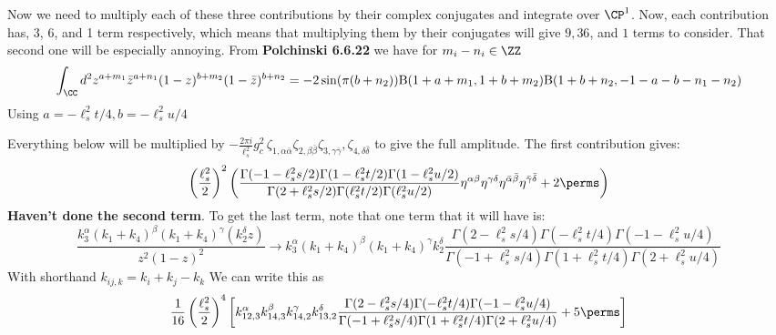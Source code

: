 	Now we need to multiply each of these three contributions by their complex conjugates and integrate over $\CP^1$. Now, each contribution has, 3, 6, and 1 term respectively, which means that multiplying them by their conjugates will give $9, 36$, and $1$ terms to consider. That second one will be especially annoying. From \textbf{Polchinski 6.6.22} we have for $m_i - n_i \in \ZZ$
	\[
		\int_{\CC} d^2 z^{a+m_1} \bar z^{a+n_1} (1-z)^{b+m_2} (1-\bar z)^{b+n_2} = -2 \sin(\pi(b+n_2)) \mathrm B(1+a+m_1, 1+b+m_2) \mathrm B (1+b+n_2, -1- a - b - n_1 - n_2)
	\]
	Using $a = -\ell_s^2 t/4, b=-\ell_s^2 u/4$
	
	Everything below will be multiplied by $-\frac{2 \pi i}{\ell_s^2} g_c^2\, \zeta_{1, \alpha \bar \alpha} \zeta_{2, \beta \bar \beta} \zeta_{3, \gamma \bar \gamma}, \zeta_{4, \delta \bar \delta}$ to give the full amplitude. The first contribution gives:
	\[
		 \left(\frac{\ell_s^2}{2}\right)^2 \left(\frac{\Gamma(-1-\ell_s^2 s/2) \Gamma(1-\ell_s^2 t/2) \Gamma(1-\ell_s^2 u/2)}{\Gamma(2+\ell_s^2 s/2) \Gamma(\ell_s^2 t/2) \Gamma(\ell_s^2 u/2)} \eta^{\alpha \beta} \eta^{\gamma \delta} \eta^{\bar \alpha \bar \beta} \eta^{\bar \gamma \bar \delta} + 2 \perms \right)
	\]
	\textbf{Haven't done the second term}.
	To get the last term, note that one term that it will have is:
	\[
		\frac{k_3^\alpha (k_1+k_4)^\beta (k_1+k_4)^\gamma (k_2^\delta z)}{z^2 (1-z)^2} \to k_3^\alpha (k_1+k_4)^\beta (k_1+k_4)^\gamma k_2^\delta \frac{\Gamma(2-\ell_s^2 s/4) \Gamma(-\ell_s^2 t/4) \Gamma(-1-\ell_s^2 u/4)}{\Gamma(-1+\ell_s^2 s/4) \Gamma(1+\ell_s^2 t/4) \Gamma(2+\ell_s^2 u/4)}
	\]
	With shorthand $k_{ij,k} = k_i + k_j - k_k$ We can write this as
	\[
		 \frac{1}{16} \left(\frac{\ell_s^2}{2} \right)^4 \left[k_{12,3}^\alpha k_{14,3}^\beta k_{14,2}^\gamma k_{13,2}^\delta \frac{\Gamma(2-\ell_s^2 s/4) \Gamma(-\ell_s^2 t/4) \Gamma(-1-\ell_s^2 u/4)}{\Gamma(-1+\ell_s^2 s/4) \Gamma(1+\ell_s^2 t/4) \Gamma(2+\ell_s^2 u/4)} + 5 \perms \right]
	\]